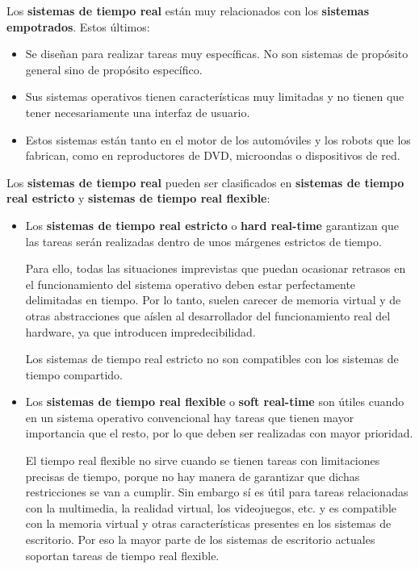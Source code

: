 Los \textbf{sistemas de tiempo real} están muy relacionados con los
\textbf{sistemas empotrados}{}. Estos últimos:

\begin{itemize}
\item
  Se diseñan para realizar tareas muy específicas. No son sistemas de
  propósito general sino de propósito específico.
\item
  Sus sistemas operativos tienen características muy limitadas y no
  tienen que tener necesariamente una interfaz de usuario.
\item
  Estos sistemas están tanto en el motor de los automóviles y los robots
  que los fabrican, como en reproductores de DVD, microondas o
  dispositivos de red.
\end{itemize}

Los \textbf{sistemas de tiempo real} pueden ser clasificados en
\textbf{sistemas de tiempo real estricto} y \textbf{sistemas de tiempo
real flexible}:

\begin{itemize}
\item
  Los \textbf{sistemas de tiempo real estricto} {}{} o \textbf{{}hard
  real-time} garantizan que las tareas serán realizadas dentro de unos
  márgenes estrictos de tiempo.

  Para ello, todas las situaciones imprevistas que puedan ocasionar
  retrasos en el funcionamiento del sistema operativo deben estar
  perfectamente delimitadas en tiempo. Por lo tanto, suelen carecer de
  memoria virtual y de otras abstracciones que aíslen al desarrollador
  del funcionamiento real del hardware, ya que introducen
  impredecibilidad.

  Los sistemas de tiempo real estricto no son compatibles con los
  sistemas de tiempo compartido.
\item
  Los \textbf{sistemas de tiempo real flexible} {} {} o \textbf{{}soft
  real-time} son útiles cuando en un sistema operativo convencional hay
  tareas que tienen mayor importancia que el resto, por lo que deben ser
  realizadas con mayor prioridad.

  El tiempo real flexible no sirve cuando se tienen tareas con
  limitaciones precisas de tiempo, porque no hay manera de garantizar
  que dichas restricciones se van a cumplir. Sin embargo sí es útil para
  tareas relacionadas con la multimedia, la realidad virtual, los
  videojuegos, etc. y es compatible con la memoria virtual y otras
  características presentes en los sistemas de escritorio. Por eso la
  mayor parte de los sistemas de escritorio actuales soportan tareas de
  tiempo real flexible.
\end{itemize}

